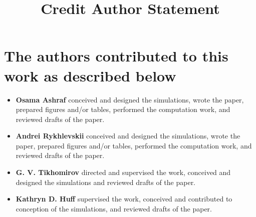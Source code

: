 \documentclass[review]{elsarticle}
\begin{document}
\begin{frontmatter}
\title{Credit Author Statement}
\end{frontmatter}
\section*{The authors contributed to this work as described below}
\begin{itemize}
	\item \textbf{Osama Ashraf} conceived and designed the simulations, wrote the paper, prepared figures 
	and/or tables, performed the computation work, and reviewed drafts of the paper.
	\item \textbf{Andrei Rykhlevskii} conceived and designed the simulations, wrote the paper, prepared figures 
	and/or tables, performed the computation work, and reviewed drafts of the paper.
	\item \textbf{G. V. Tikhomirov} directed and supervised the work, conceived and designed the simulations and reviewed drafts of the paper.
	\item \textbf{Kathryn D. Huff} supervised the work, conceived and contributed to conception of the simulations, and reviewed drafts of the paper.
\end{itemize}
\end{document}
